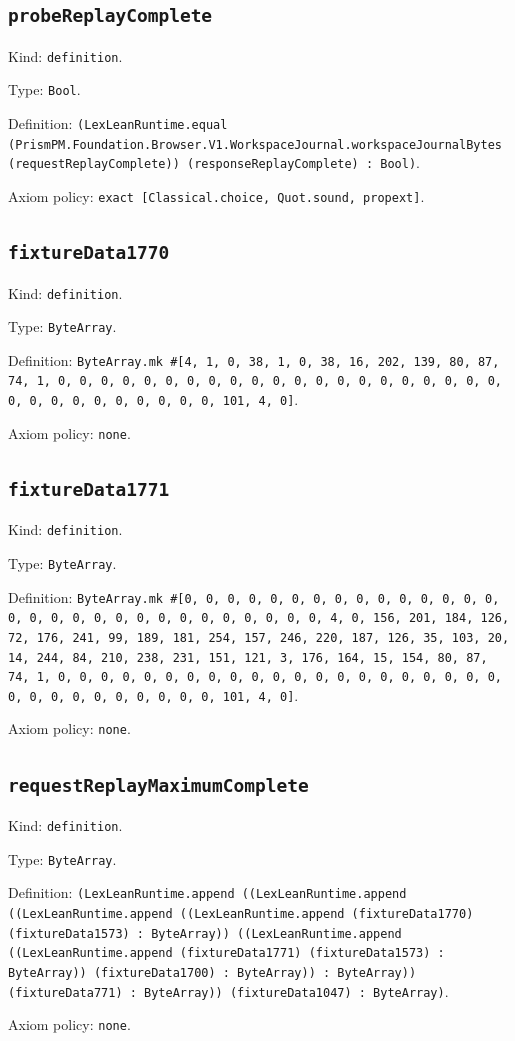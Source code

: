 \documentclass[11pt]{article}
\begin{document}
\subsection*{\texttt{probeReplayComplete}}
\noindent Kind: \texttt{definition}.\par
\noindent Type: \texttt{Bool}.\par
\noindent Definition: \texttt{(LexLeanRuntime.equal (PrismPM.Foundation.Browser.V1.WorkspaceJournal.workspaceJournalBytes (requestReplayComplete)) (responseReplayComplete) : Bool)}.\par
\noindent Axiom policy: \texttt{exact [Classical.choice, Quot.sound, propext]}.\par
\subsection*{\texttt{fixtureData1770}}
\noindent Kind: \texttt{definition}.\par
\noindent Type: \texttt{ByteArray}.\par
\noindent Definition: \texttt{ByteArray.mk \#[4, 1, 0, 38, 1, 0, 38, 16, 202, 139, 80, 87, 74, 1, 0, 0, 0, 0, 0, 0, 0, 0, 0, 0, 0, 0, 0, 0, 0, 0, 0, 0, 0, 0, 0, 0, 0, 0, 0, 0, 0, 0, 0, 0, 0, 101, 4, 0]}.\par
\noindent Axiom policy: \texttt{none}.\par
\subsection*{\texttt{fixtureData1771}}
\noindent Kind: \texttt{definition}.\par
\noindent Type: \texttt{ByteArray}.\par
\noindent Definition: \texttt{ByteArray.mk \#[0, 0, 0, 0, 0, 0, 0, 0, 0, 0, 0, 0, 0, 0, 0, 0, 0, 0, 0, 0, 0, 0, 0, 0, 0, 0, 0, 0, 0, 0, 4, 0, 156, 201, 184, 126, 72, 176, 241, 99, 189, 181, 254, 157, 246, 220, 187, 126, 35, 103, 20, 14, 244, 84, 210, 238, 231, 151, 121, 3, 176, 164, 15, 154, 80, 87, 74, 1, 0, 0, 0, 0, 0, 0, 0, 0, 0, 0, 0, 0, 0, 0, 0, 0, 0, 0, 0, 0, 0, 0, 0, 0, 0, 0, 0, 0, 0, 0, 0, 101, 4, 0]}.\par
\noindent Axiom policy: \texttt{none}.\par
\subsection*{\texttt{requestReplayMaximumComplete}}
\noindent Kind: \texttt{definition}.\par
\noindent Type: \texttt{ByteArray}.\par
\noindent Definition: \texttt{(LexLeanRuntime.append ((LexLeanRuntime.append ((LexLeanRuntime.append ((LexLeanRuntime.append (fixtureData1770) (fixtureData1573) : ByteArray)) ((LexLeanRuntime.append ((LexLeanRuntime.append (fixtureData1771) (fixtureData1573) : ByteArray)) (fixtureData1700) : ByteArray)) : ByteArray)) (fixtureData771) : ByteArray)) (fixtureData1047) : ByteArray)}.\par
\noindent Axiom policy: \texttt{none}.\par
\end{document}
